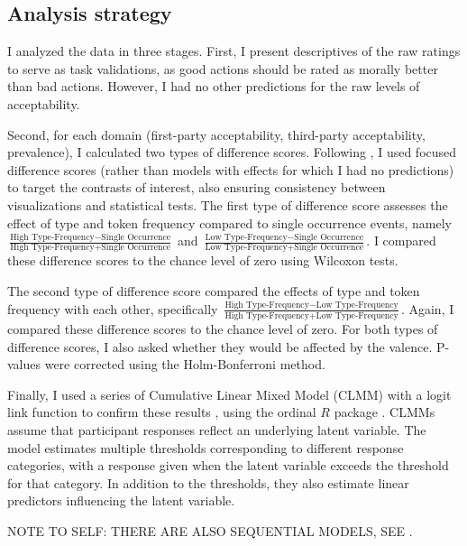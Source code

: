 \documentclass[
]{article}
\begin{document}
\clearpage

\subsection{Analysis strategy}\label{analysis-strategy}

I analyzed the data in three stages. First, I present descriptives of the raw ratings to serve as task validations, as good actions should be rated as morally better than bad actions. However, I had no other predictions for the raw levels of acceptability.

Second, for each domain (first-party acceptability, third-party acceptability, prevalence), I calculated two types of difference scores. Following \citep{Rosenthal1999}, I used focused difference scores (rather than models with effects for which I had no predictions) to target the contrasts of interest, also ensuring consistency between visualizations and statistical tests. The first type of difference score assesses the effect of type and token frequency compared to single occurrence events, namely \(\frac{\text{High Type-Frequency} - \text{Single Occurrence}}{\text{High Type-Frequency} + \text{Single Occurrence}}\) and \(\frac{\text{Low Type-Frequency} - \text{Single Occurrence}}{\text{Low Type-Frequency} + \text{Single Occurrence}}\). I compared these difference scores to the chance level of zero using Wilcoxon tests.

The second type of difference score compared the effects of type and token frequency with each other, specifically \(\frac{\text{High Type-Frequency} - \text{Low Type-Frequency}}{\text{High Type-Frequency} + \text{Low Type-Frequency}}\). Again, I compared these difference scores to the chance level of zero. For both types of difference scores, I also asked whether they would be affected by the valence. P-values were corrected using the Holm-Bonferroni method.

Finally, I used a series of Cumulative Linear Mixed Model (CLMM) with a logit link function to confirm these results \citep{Buerkner2019, Liddell2018}, using the ordinal \(R\) package \citep{ordinal}. CLMMs assume that participant responses reflect an underlying latent variable. The model estimates multiple thresholds corresponding to different response categories, with a response given when the latent variable exceeds the threshold for that category. In addition to the thresholds, they also estimate linear predictors influencing the latent variable.

NOTE TO SELF: THERE ARE ALSO SEQUENTIAL MODELS, SEE \citep{Buerkner2019}.
\end{document}
